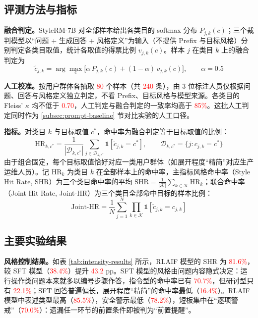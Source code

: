\documentclass[fontset=fandol,type=master,campus=shenzhen,etitleauto=true]{hithesisbook}
\newcommand{\rev}[1]{\textcolor{red}{#1}}
\begin{document}
\subsection{评测方法与指标}\label{ux7efcux5408ux8bc4ux6d4bux6307ux6807}

\textbf{融合判定。}StyleRM-7B 对全部样本给出各类目的 softmax 分布 $P_{j,k}(c)$；三个裁判模型以“问题 + 生成回答 + 风格定义”为输入（不提供 Prefix 与目标风格）分别判定各类目取值，统计各取值的得票比例 $v_{j,k}(c)$。样本 $j$ 在类目 $k$ 上的融合判定为
\begin{equation}\label{eq:fused-level}
\tilde{c}_{j,k} = \arg\max_{c} \bigl[ \alpha\, P_{j,k}(c) + (1 - \alpha)\, v_{j,k}(c) \bigr], \qquad \alpha = 0.5
\end{equation}

\textbf{人工校准。}按用户群体各抽取 \rev{80} 个样本（共 \rev{240} 条），由 3 位标注人员仅根据问题、回答与风格定义独立判定，不看 Prefix、目标风格与模型来源。各类目的 Fleiss' $\kappa$ 均不低于 \rev{0.70}，人工判定与融合判定的一致率均高于 \rev{85\%}。这批人工判定同时作为 \ref{subsec:prompt-baseline} 节对比实验的人工口径。

\textbf{指标。}对类目 $k$ 与目标取值 $c^*$，命中率为融合判定等于目标取值的比例：
\begin{equation}
\text{HR}_{k,c^*} = \frac{1}{|\mathcal{D}_{k,c^*}|} \sum_{j \in \mathcal{D}_{k,c^*}} \mathbb{1}\!\left[\tilde{c}_{j,k} = c^*\right], \qquad \mathcal{D}_{k,c^*} = \{ j : c_{j,k} = c^* \}
\end{equation}
由于组合固定，每个目标取值恰好对应一类用户群体（如展开程度“精简”对应生产运维人员）。记 $\text{HR}_k$ 为类目 $k$ 在全部样本上的命中率，主指标风格命中率（Style Hit Rate, SHR）为三个类目命中率的平均 $\text{SHR} = \frac{1}{|\mathcal{K}|}\sum_{k \in \mathcal{K}} \text{HR}_k$；联合命中率（Joint Hit Rate, Joint-HR）为三个类目全部命中目标的样本比例：
\begin{equation}\label{eq:joint-ihr}
\text{Joint-HR} = \frac{1}{N} \sum_{j=1}^{N} \prod_{k \in \mathcal{K}} \mathbb{1}\!\left[\tilde{c}_{j,k} = c_{j,k}\right]
\end{equation}

\subsection{主要实验结果}\label{ux4e3bux8981ux7ed3ux679c-1}

\textbf{风格控制结果。}如表 \ref{tab:intensity-results} 所示，RLAIF 模型的 SHR 为 \rev{81.6\%}，较 SFT 模型（\rev{38.4\%}）提升 \rev{43.2} pp。SFT 模型的风格由问题内容隐式决定：运行操作类问题本来就多以编号步骤作答，指令型的命中率已有 \rev{70.7\%}，但研讨型只有 \rev{22.1\%}；SFT 回答普遍偏长，展开程度“精简”的命中率最低（\rev{16.4\%}）。RLAIF 模型中表述类型最高（\rev{85.5\%}），安全警示最低（\rev{78.2\%}），短板集中在“逐项警戒”（\rev{70.0\%}）：遗漏任一环节的前置条件即被判为“前置提醒”。
\end{document}
